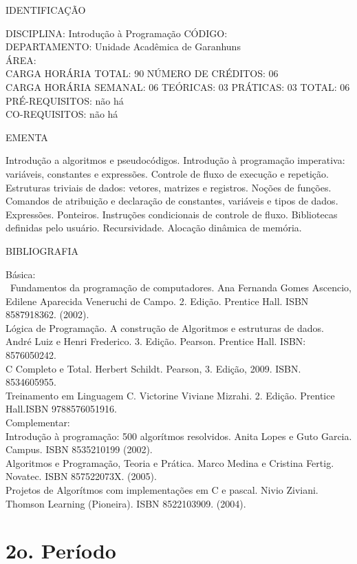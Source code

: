\documentclass[
	12pt,				%
	openright,			%
  oneside,     %
	a4paper,			%
	chapter=TITLE,		%
	english,			%
	french,				%
	spanish,			%
	brazil				%
	]{abntex2}
\begin{document}
\begin{apendicesenv}
\newpage IDENTIFICAÇÃO

DISCIPLINA: Introdução à Programação CÓDIGO:\\
DEPARTAMENTO: Unidade Acadêmica de Garanhuns\\
ÁREA: \\
CARGA HORÁRIA TOTAL: 90 NÚMERO DE CRÉDITOS: 06\\
CARGA HORÁRIA SEMANAL: 06 TEÓRICAS: 03 PRÁTICAS: 03 TOTAL: 06\\
PRÉ-REQUISITOS: não há\\
CO-REQUISITOS: não há

EMENTA 

Introdução a algoritmos e pseudocódigos. Introdução à programação
imperativa: variáveis, constantes e expressões. Controle de fluxo de
execução e repetição. Estruturas triviais de dados: vetores, matrizes e
registros. Noções de funções. Comandos de atribuição e declaração de
constantes, variáveis e tipos de dados. Expressões. Ponteiros.
Instruções condicionais de controle de fluxo. Bibliotecas definidas
pelo usuário. Recursividade. Alocação dinâmica de memória.

BIBLIOGRAFIA 

Básica:\\\
Fundamentos da programação de computadores. Ana Fernanda Gomes Ascencio,
Edilene Aparecida Veneruchi de Campo. 2. Edição. Prentice Hall. ISBN
8587918362. (2002).\\
Lógica de Programação. A construção de Algoritmos e estruturas de dados.
André Luiz e Henri Frederico. 3. Edição. Pearson. Prentice Hall. ISBN:
8576050242.\\
C Completo e Total. Herbert Schildt. Pearson, 3. Edição, 2009. ISBN.
8534605955.\\
Treinamento em Linguagem C. Victorine Viviane Mizrahi. 2. Edição.
Prentice Hall.ISBN 9788576051916.\\
Complementar:\\
Introdução à programação: 500 algorítmos resolvidos. Anita Lopes e Guto
Garcia. Campus. ISBN 8535210199 (2002).\\
Algoritmos e Programação, Teoria e Prática. Marco Medina e Cristina
Fertig. Novatec. ISBN 857522073X. (2005).\\
Projetos de Algorítmos com implementações em C e pascal. Nivio Ziviani.
Thomson Learning (Pioneira). ISBN 8522103909. (2004).\\
\newpage

\section*{2o. Período}


\end{apendicesenv}
\end{document}
